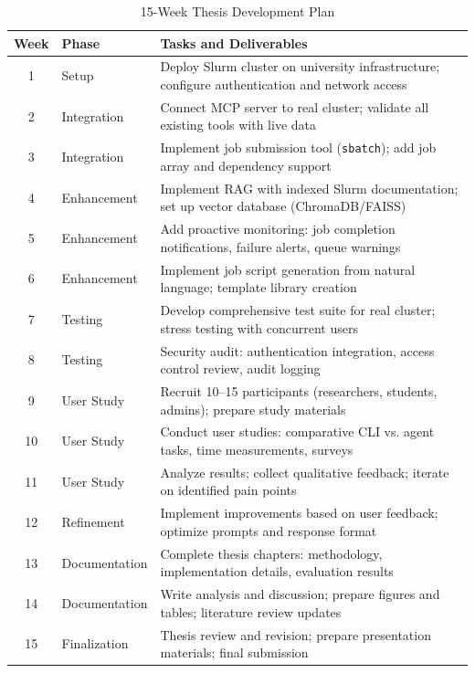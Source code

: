 \begin{table}[H]
\centering
\small
\caption{15-Week Thesis Development Plan}
\label{tab:thesis-plan}
\begin{tabular}{|c|l|p{8cm}|}
\hline
\textbf{Week} & \textbf{Phase} & \textbf{Tasks and Deliverables} \\
\hline
1 & Setup & Deploy Slurm cluster on university infrastructure; configure authentication and network access \\
\hline
2 & Integration & Connect MCP server to real cluster; validate all existing tools with live data \\
\hline
3 & Integration & Implement job submission tool (\texttt{sbatch}); add job array and dependency support \\
\hline
4 & Enhancement & Implement RAG with indexed Slurm documentation; set up vector database (ChromaDB/FAISS) \\
\hline
5 & Enhancement & Add proactive monitoring: job completion notifications, failure alerts, queue warnings \\
\hline
6 & Enhancement & Implement job script generation from natural language; template library creation \\
\hline
7 & Testing & Develop comprehensive test suite for real cluster; stress testing with concurrent users \\
\hline
8 & Testing & Security audit: authentication integration, access control review, audit logging \\
\hline
9 & User Study & Recruit 10--15 participants (researchers, students, admins); prepare study materials \\
\hline
10 & User Study & Conduct user studies: comparative CLI vs. agent tasks, time measurements, surveys \\
\hline
11 & User Study & Analyze results; collect qualitative feedback; iterate on identified pain points \\
\hline
12 & Refinement & Implement improvements based on user feedback; optimize prompts and response format \\
\hline
13 & Documentation & Complete thesis chapters: methodology, implementation details, evaluation results \\
\hline
14 & Documentation & Write analysis and discussion; prepare figures and tables; literature review updates \\
\hline
15 & Finalization & Thesis review and revision; prepare presentation materials; final submission \\
\hline
\end{tabular}
\end{table}


